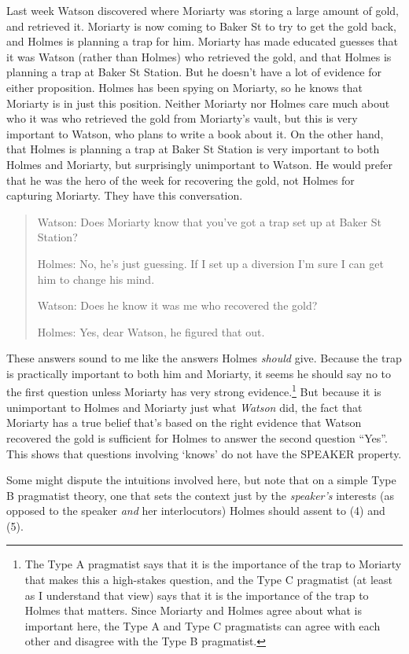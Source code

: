 \documentclass[
  10pt,
  letterpaper,
  DIV=11,
  numbers=noendperiod,
  twoside]{scrartcl}
\begin{document}
Last week Watson discovered where Moriarty was storing a large amount of
gold, and retrieved it. Moriarty is now coming to Baker St to try to get
the gold back, and Holmes is planning a trap for him. Moriarty has made
educated guesses that it was Watson (rather than Holmes) who retrieved
the gold, and that Holmes is planning a trap at Baker St Station. But he
doesn't have a lot of evidence for either proposition. Holmes has been
spying on Moriarty, so he knows that Moriarty is in just this position.
Neither Moriarty nor Holmes care much about who it was who retrieved the
gold from Moriarty's vault, but this is very important to Watson, who
plans to write a book about it. On the other hand, that Holmes is
planning a trap at Baker St Station is very important to both Holmes and
Moriarty, but surprisingly unimportant to Watson. He would prefer that
he was the hero of the week for recovering the gold, not Holmes for
capturing Moriarty. They have this conversation.

\begin{quote}
Watson: Does Moriarty know that you've got a trap set up at Baker St
Station?

Holmes: No, he's just guessing. If I set up a diversion I'm sure I can
get him to change his mind.

Watson: Does he know it was me who recovered the gold?

Holmes: Yes, dear Watson, he figured that out.
\end{quote}

These answers sound to me like the answers Holmes \emph{should} give.
Because the trap is practically important to both him and Moriarty, it
seems he should say no to the first question unless Moriarty has very
strong evidence.\footnote{The Type A pragmatist says that it is the
  importance of the trap to Moriarty that makes this a high-stakes
  question, and the Type C pragmatist (at least as I understand that
  view) says that it is the importance of the trap to Holmes that
  matters. Since Moriarty and Holmes agree about what is important here,
  the Type A and Type C pragmatists can agree with each other and
  disagree with the Type B pragmatist.} But because it is unimportant to
Holmes and Moriarty just what \emph{Watson} did, the fact that Moriarty
has a true belief that's based on the right evidence that Watson
recovered the gold is sufficient for Holmes to answer the second
question ``Yes''. This shows that questions involving `knows' do not
have the SPEAKER property.

Some might dispute the intuitions involved here, but note that on a
simple Type B pragmatist theory, one that sets the context just by the
\emph{speaker's} interests (as opposed to the speaker \emph{and} her
interlocutors) Holmes should assent to (4) and (5).
\end{document}
